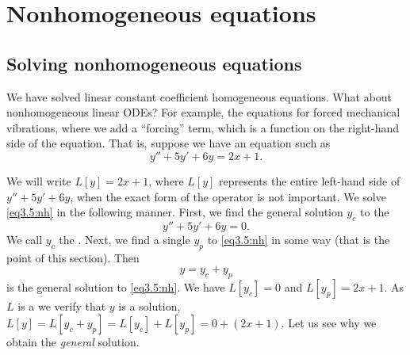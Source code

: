 \section{Nonhomogeneous equations}
\label{sec:nonhom}




\subsection{Solving nonhomogeneous equations}

We have solved linear constant coefficient homogeneous 
equations.
What about nonhomogeneous linear ODEs?
For example, the equations for forced mechanical vibrations, where we add a ``forcing'' term, which is a function on the right-hand side of the equation.
That is, suppose we have an equation such as
\begin{equation} \label{eq3.5:nh}
y'' + 5y'+ 6y = 2x+1 .
\end{equation}


We will write $L[y] = 2x+1$, where $L[y]$ represents the entire left-hand side of $y'' + 5y' + 6y$, when the exact form of the operator is not
important.
We solve \eqref{eq3.5:nh} in the following manner.  First, we find the general
solution $y_c$
to the \emph{}
\begin{equation} \label{eq3.5:h}
y'' + 5y'+ 6y = 0 .
\end{equation}
We call $y_c$ the \emph{}.
Next, we find a
single \emph{} $y_p$ to \eqref{eq3.5:nh} in some
way (that is the point of this section).  Then
\begin{equation*}
y = y_c + y_p
\end{equation*}
is the general solution to \eqref{eq3.5:nh}.  
We have $L[y_c] = 0$ and $L[y_p] = 2x+1$.  As
$L$ is a \emph{}
we verify that $y$ is a solution, $L[y] = L [y_c + y_p] = L[y_c] + L[y_p] = 0
+ (2x+1)$.  Let us see
why we obtain the \emph{general} solution.

